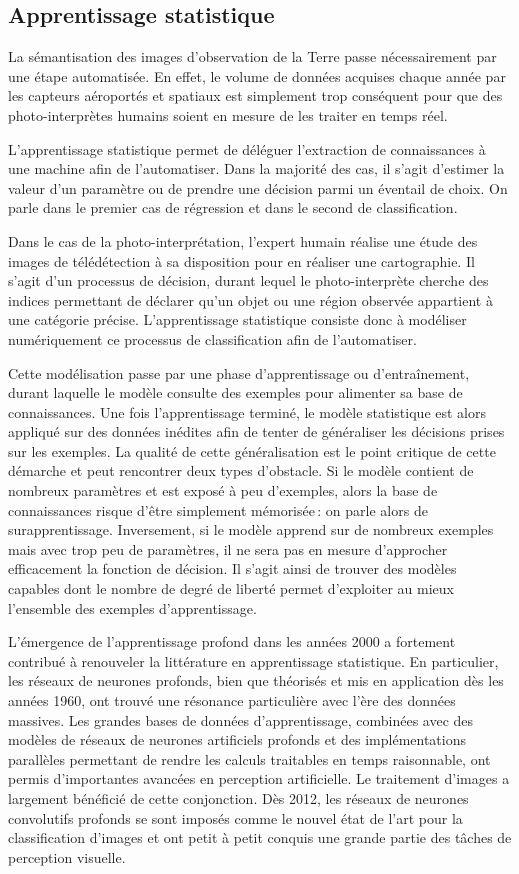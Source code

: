 \subsection{Apprentissage statistique}

La sémantisation des images d'observation de la Terre passe nécessairement par une étape automatisée. En effet, le volume de données acquises chaque année par les capteurs aéroportés et spatiaux est simplement trop conséquent pour que des photo-interprètes humains soient en mesure de les traiter en temps réel.

L'apprentissage statistique permet de déléguer l'extraction de connaissances à une machine afin de l'automatiser. Dans la majorité des cas, il s'agit d'estimer la valeur d'un paramètre ou de prendre une décision parmi un éventail de choix. On parle dans le premier cas de régression et dans le second de classification.

Dans le cas de la photo-interprétation, l'expert humain réalise une étude des images de télédétection à sa disposition pour en réaliser une cartographie. Il s'agit d'un processus de décision, durant lequel le photo-interprète cherche des indices permettant de déclarer qu'un objet ou une région observée appartient à une catégorie précise. L'apprentissage statistique consiste donc à modéliser numériquement ce processus de classification afin de l'automatiser.

Cette modélisation passe par une phase d'apprentissage ou d'entraînement, durant laquelle le modèle consulte des exemples pour alimenter sa base de connaissances. Une fois l'apprentissage terminé, le modèle statistique est alors appliqué sur des données inédites afin de tenter de généraliser les décisions prises sur les exemples. La qualité de cette généralisation est le point critique de cette démarche et peut rencontrer deux types d'obstacle. Si le modèle contient de nombreux paramètres et est exposé à peu d'exemples, alors la base de connaissances risque d'être simplement mémorisée\,: on parle alors de surapprentissage. Inversement, si le modèle apprend sur de nombreux exemples mais avec trop peu de paramètres, il ne sera pas en mesure d'approcher efficacement la fonction de décision. Il s'agit ainsi de trouver des modèles capables dont le nombre de degré de liberté permet d'exploiter au mieux l'ensemble des exemples d'apprentissage.

L'émergence de l'apprentissage profond dans les années 2000 a fortement contribué à renouveler la littérature en apprentissage statistique. En particulier, les réseaux de neurones profonds, bien que théorisés et mis en application dès les années 1960, ont trouvé une résonance particulière avec l'ère des données massives. Les grandes bases de données d'apprentissage, combinées avec des modèles de réseaux de neurones artificiels profonds et des implémentations parallèles permettant de rendre les calculs traitables en temps raisonnable, ont permis d'importantes avancées en perception artificielle. Le traitement d'images a largement bénéficié de cette conjonction. Dès 2012, les réseaux de neurones convolutifs profonds se sont imposés comme le nouvel état de l'art pour la classification d'images et ont petit à petit conquis une grande partie des tâches de perception visuelle.

